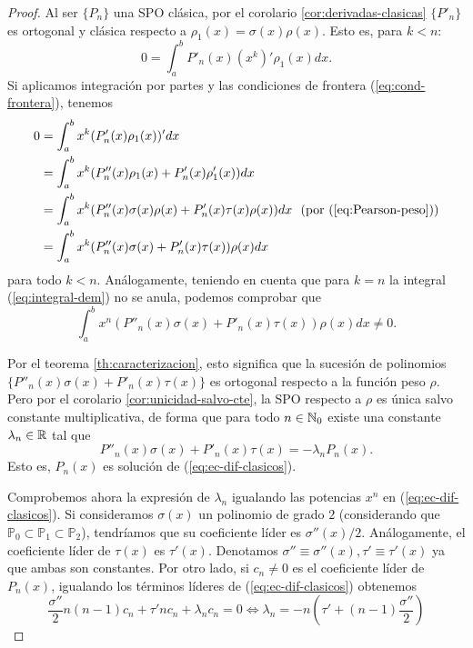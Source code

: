 \begin{proof}
    Al ser $\{P_n\}$ una SPO clásica, por el corolario \ref{cor:derivadas-clasicas} $\{P'_n\}$ es ortogonal y clásica respecto a $\rho_1(x)=\sigma(x)\rho(x)$. Esto es, para $k<n$:
    \begin{equation}
        \label{eq:integral-dem}
        0=\int_a^b P'_n(x)(x^k)' \rho_1(x)dx.
    \end{equation}
    Si aplicamos integración por partes y las condiciones de frontera (\ref{eq:cond-frontera}), tenemos
    \begin{equation*}
        \begin{split}
            0&= \int_a^b x^k (P'_n(x) \rho_1(x))'dx \\
            &= \int_a^b x^k (P''_n(x) \rho_1(x)+P'_n(x)\rho_1'(x))dx  \\
            &= \int_a^b x^k (P''_n(x)\sigma(x)\rho(x)+P'_n(x)\tau(x)\rho(x))dx \ \ \text{(por (\ref{eq:Pearson-peso}))}  \\
            &= \int_a^b x^k (P''_n(x)\sigma(x)+P'_n(x)\tau(x))\rho(x)dx
        \end{split}
    \end{equation*}
    para todo $k<n$. Análogamente, teniendo en cuenta que para $k=n$ la integral (\ref{eq:integral-dem}) no se anula, podemos comprobar que
    $$
    \int_a^b x^n (P''_n(x)\sigma(x)+P'_n(x)\tau(x))\rho(x)dx  \neq 0.
    $$
    
    Por el teorema \ref{th:caracterizacion}, esto significa que la sucesión de polinomios $\{P''_n(x)\sigma(x)+P'_n(x)\tau(x)\}$ es ortogonal respecto a la función peso $\rho$. Pero por el corolario \ref{cor:unicidad-salvo-cte}, la SPO respecto a $\rho$ es única salvo constante multiplicativa, de forma que para todo $n\in\mathbb{N}_0$ existe una constante $\lambda_n\in\mathbb{R}$ tal que
    $$
    P''_n(x)\sigma(x)+P'_n(x)\tau(x) = -\lambda_n P_n(x).
    $$
    Esto es, $P_n(x)$ es solución de (\ref{eq:ec-dif-clasicos}).

    Comprobemos ahora la expresión de $\lambda_n$ igualando las potencias $x^n$ en (\ref{eq:ec-dif-clasicos}). Si consideramos $\sigma(x)$ un polinomio de grado $2$ (considerando que $\mathbb P_0\subset\mathbb P_1\subset \mathbb{P}_2$), tendríamos que su coeficiente líder es $\sigma''(x)/2$. Análogamente, el coeficiente líder de $\tau(x)$ es $\tau'(x)$. Denotamos $\sigma'' \equiv \sigma''(x), \tau'\equiv\tau'(x)$ ya que ambas son constantes. Por otro lado, si $c_n\neq 0$ es el coeficiente líder de $P_n(x)$, igualando los términos líderes de (\ref{eq:ec-dif-clasicos}) obtenemos
    $$
    \dfrac {\sigma''} 2 n (n-1) c_n + \tau' n c_n + \lambda_n c_n = 0 \Leftrightarrow \lambda_n = -n\left(\tau' + (n-1)\dfrac{\sigma''}{2}\right)
    $$
\end{proof}


